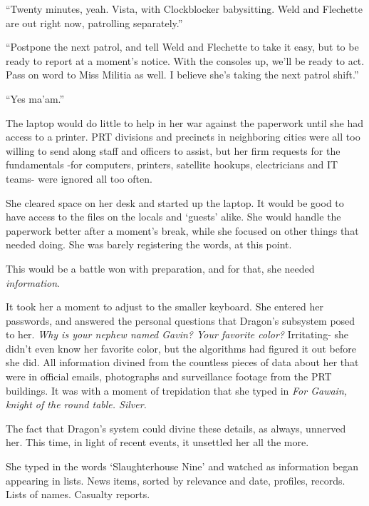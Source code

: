 ``Twenty minutes, yeah.  Vista, with Clockblocker babysitting.  Weld and Flechette are out right now, patrolling separately.''



``Postpone the next patrol, and tell Weld and Flechette to take it easy, but to be ready to report at a moment's notice.  With the consoles up, we'll be ready to act.  Pass on word to Miss Militia as well.  I believe she's taking the next patrol shift.''



``Yes ma'am.''



The laptop would do little to help in her war against the paperwork until she had access to a printer.  PRT divisions and precincts in neighboring cities were all too willing to send along staff and officers to assist, but her firm requests for the fundamentals -for computers, printers, satellite hookups, electricians and IT teams- were ignored all too often.



She cleared space on her desk and started up the laptop.  It would be good to have access to the files on the locals and `guests' alike.  She would handle the paperwork better after a moment's break, while she focused on other things that needed doing.  She was barely registering the words, at this point.



This would be a battle won with preparation, and for that, she needed \emph{information}.



It took her a moment to adjust to the smaller keyboard.  She entered her passwords, and answered the personal questions that Dragon's subsystem posed to her.\emph{  Why is your nephew named Gavin?  Your favorite color?  }Irritating- she didn't even know her favorite color, but the algorithms had figured it out before she did.  All information divined from the countless pieces of data about her that were in official emails, photographs and surveillance footage from the PRT buildings.  It was with a moment of trepidation that she typed in \emph{For Gawain, knight of the round table.  Silver.}



The fact that Dragon's system could divine these details, as always, unnerved her.  This time, in light of recent events, it unsettled her all the more.



She typed in the words `Slaughterhouse Nine' and watched as information began appearing in lists.  News items, sorted by relevance and date, profiles, records.  Lists of names.  Casualty reports.



